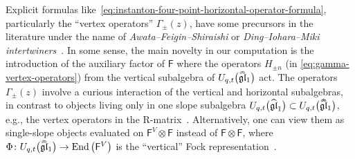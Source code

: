 \documentclass[10pt,a4paper]{amsart}
\numberwithin{equation}{section}
\renewcommand{\hat}[1]{\widehat{#1}}
\newcommand{\hhat}[1]{\hat{\vphantom{\rule{1pt}{5.5pt}}\smash{\hat{#1}}}}
\newcommand{\lie}[1]{\mathfrak{#1}}
\newcommand{\sF}{\mathsf{F}}
\DeclareMathOperator{\End}{End}
\begin{document}
\begin{MyParagraph}
Explicit formulas like~\eqref{eq:instanton-four-point-horizontal-operator-formula},
particularly the ``vertex operators'' $\Gamma_\pm(z)$, have some
precursors in the literature under the name of {\it
 Awata--Feigin--Shiraishi} or {\it Ding--Iohara--Miki intertwiners}~\cite{Awata2012}. In some sense, the main novelty in our computation
is the introduction of the auxiliary factor of $\sF$ where the
operators $H_{\pm n}$ (in \eqref{eq:gamma-vertex-operators}) from the
vertical subalgebra of $U_{q,t}\big(\hhat{\lie{gl}}_1\big)$ act. The
operators $\Gamma_\pm(z)$ involve a curious interaction of the
vertical and horizontal subalgebras, in contrast to objects living
only in one slope subalgebra
$U_{q,t}\big(\hat{\lie{gl}}_1\big) \subset U_{q,t}\big(\hhat{\lie{gl}}_1\big)$, e.g.,
the vertex operators in the R-matrix~\cite{Negut2015}. Alternatively,
one can view them as single-slope objects evaluated on
$\sF^V \otimes \sF$ instead of $\sF \otimes \sF$, where
$\Phi\colon U_{q,t}\big(\hhat{\lie{gl}}_1\big) \to \End\big(\sF^V\big)$ is the
``vertical'' Fock representation~\cite{Negut2020}.
\end{MyParagraph}
\end{document}
